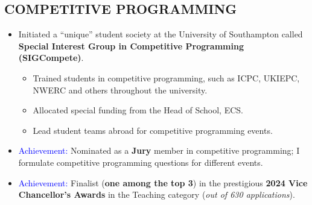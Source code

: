\documentclass[margin]{res}
\begin{document}
\begin{resume}
\section{COMPETITIVE PROGRAMMING}
\begin{itemize}
    \item Initiated a ``unique'' student society at the University of Southampton called \textbf{Special Interest Group in Competitive Programming (SIGCompete)}.
    \begin{itemize}
        \item Trained students in competitive programming, such as ICPC, UKIEPC, NWERC and others throughout the university.
        \item Allocated special funding from the Head of School, ECS.
        \item Lead student teams abroad for competitive programming events.
    \end{itemize}
    \item \textcolor{blue}{Achievement:} Nominated as a \textbf{Jury} member in competitive programming; I formulate competitive programming questions for different events.
    \item \textcolor{blue}{Achievement:} Finalist (\textbf{one among the top 3}) in the prestigious \textbf{2024 Vice Chancellor's Awards} in the Teaching category (\textit{out of 630 applications}).
\end{itemize}


\end{resume}
\end{document}
